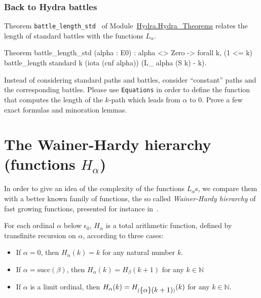 \documentclass[a4paper]{book}
\begin{document}
\subsubsection{Back to Hydra battles}

Theorem \texttt{battle\_length\_std } of
Module~\href{../src/html/hydras.Hydra.Hydra_Theorems.html\#battle_length_std}{Hydra.Hydra\_Theorems} relates the length of standard battles with the functions $L_\alpha$.

\begin{Coqsrc}
Theorem battle_length_std (alpha : E0)  :
  alpha <> Zero ->
  forall k, (1 <= k)%
            battle_length standard k (iota (cnf alpha))
                         (L_ alpha (S k) - k).
\end{Coqsrc}


\begin{project}
Instead of considering standard paths and battles, consider ``constant'' paths and the corresponding battles. Please use \texttt{Equations} in order to define the function that computes the length of the $k$-path which leads  from $\alpha$ to $0$.
Prove a few  exact formulas and minoration lemmas.
\end{project}

\section{The Wainer-Hardy hierarchy (functions \texorpdfstring{$H_\alpha$}{\texttt{H\_alpha}})}

\label{sect:hardy}
In order to give an idea of the complexity of the functions  $L_\alpha$s, we compare them with a better known family of functions, the so called \emph{Wainer-Hardy hierarchy} of fast growing functions,
presented for instance in~\cite{Promel2013}. 

For each ordinal $\alpha$ below $\epsilon_0$, $H_\alpha$ is a 
total arithmetic function, defined  by  transfinite recursion on $\alpha$, according to three cases:


\begin{itemize}
\item If $\alpha=0$, then $H_\alpha (k)= k$ for any natural number $k$.
\item If $\alpha=\textrm{succ}(\beta)$, then 
$H_\alpha(k)=H_\beta(k+1)$ for any $k \in \mathbb{N}$
\item If $\alpha$ is a limit ordinal, then 
$H_\alpha(k) = H_{(\mbox{$\{\alpha\}(k+1)$})}(k)$ for any $k\in \mathbb{N}$.
\end{itemize}
\end{document}
